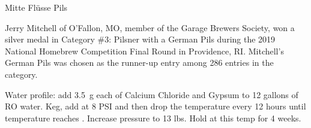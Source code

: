 \stylesection{\stylegermanpilsner}

\begin{recipie}{Mitte Flüsse Pils}

\begin{aboutblock}
Jerry Mitchell of O'Fallon, MO, member of the Garage Brewers Society, won a silver medal
in Category \#3: Pilsner with a German Pils during the 2019 National Homebrew Competition
Final Round in Providence, RI. Mitchell's German Pils was chosen as the runner-up entry
among 286 entries in the category. 
\end{aboutblock}


\begin{methodandtiming}
 
\begin{mashsteps}
\end{mashsteps}

\begin{fermentationsteps}
\end{fermentationsteps}

\begin{directions}
Water profile: add 3.5~g each of Calcium Chloride and Gypsum to 12 gallons of RO water.
Keg, add  at 8 PSI and then drop the temperature every 12 hours until temperature
reaches . Increase  pressure to 13 lbs. Hold at this temp for 4 weeks.

\end{directions}

\end{methodandtiming}

\pagebreak

\begin{ingredientsblock}

\begin{malts}
\end{malts}

\begin{hops}
\end{hops}

\begin{yeasts}
\end{yeasts}

\end{ingredientsblock}

\end{recipie}
